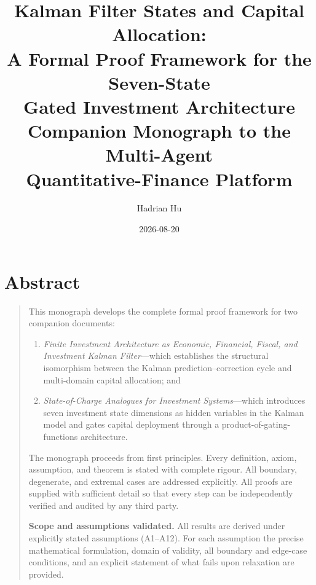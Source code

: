 \documentclass[12pt,openany]{book}
\title{Kalman Filter States and Capital Allocation:\\
A Formal Proof Framework for the Seven-State\\
Gated Investment Architecture\\[0.6em]
{\large Companion Monograph to the Multi-Agent\\
Quantitative-Finance Platform}}
\author{Hadrian Hu}
\date{2026-08-20}
\numberwithin{equation}{chapter}
\theoremstyle{plain}
\theoremstyle{definition}
\theoremstyle{remark}
\newenvironment{abstract}{%
  \chapter*{Abstract}
  \begin{quote}\small
}{%
  \end{quote}
}
\begin{document}
\maketitle

\tableofcontents
\listoftheorems[ignoreall,show={theorem,lemma,proposition,corollary,definition,axiom,assumption,conjecture}]

\begin{abstract}
This monograph develops the complete formal proof framework for two
companion documents:
\begin{enumerate}[label=(\alph*), leftmargin=2.5em, itemsep=2pt,
                  parsep=0pt, topsep=3pt]
  \item \emph{Finite Investment Architecture as Economic, Financial,
        Fiscal, and Investment Kalman Filter}---which establishes the
        structural isomorphism between the Kalman
        prediction--correction cycle and multi-domain capital
        allocation; and
  \item \emph{State-of-Charge Analogues for Investment Systems}---which
        introduces seven investment state dimensions as hidden
        variables in the Kalman model and gates capital deployment
        through a product-of-gating-functions architecture.
\end{enumerate}

\noindent
The monograph proceeds from first principles.  Every definition,
axiom, assumption, and theorem is stated with complete rigour.  All
boundary, degenerate, and extremal cases are addressed explicitly.
All proofs are supplied with sufficient detail so that every step
can be independently verified and audited by any third party.

\medskip
\noindent\textbf{Scope and assumptions validated.}
All results are derived under explicitly stated assumptions
(A1--A12).  For each assumption the precise mathematical formulation,
domain of validity, all boundary and edge-case conditions, and an
explicit statement of what fails upon relaxation are provided.


\end{abstract}
\end{document}
